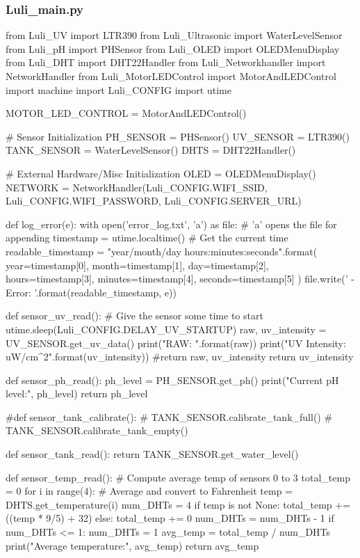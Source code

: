 \documentclass[12pt]{article} %
\begin{document}
\subsubsection{Luli\_main.py}
\begin{pythoncode}[caption={Main MicroPython Code}]
    
from Luli_UV import LTR390
from Luli_Ultrasonic import WaterLevelSensor
from Luli_pH import PHSensor
from Luli_OLED import OLEDMenuDisplay
from Luli_DHT import DHT22Handler
from Luli_Networkhandler import NetworkHandler
from Luli_MotorLEDControl import MotorAndLEDControl
import machine
import Luli_CONFIG
import utime

MOTOR_LED_CONTROL = MotorAndLEDControl()

# Sensor Initialization
PH_SENSOR = PHSensor()
UV_SENSOR = LTR390()
TANK_SENSOR = WaterLevelSensor()
DHTS = DHT22Handler()


# External Hardware/Misc Initialization
OLED = OLEDMenuDisplay()
NETWORK = NetworkHandler(Luli_CONFIG.WIFI_SSID, Luli_CONFIG.WIFI_PASSWORD, Luli_CONFIG.SERVER_URL)

def log_error(e):
    with open('error_log.txt', 'a') as file:  # 'a' opens the file for appending
        timestamp = utime.localtime()  # Get the current time
        readable_timestamp = "{year}/{month}/{day} {hours}:{minutes}:{seconds}".format(
            year=timestamp[0], month=timestamp[1], day=timestamp[2],
            hours=timestamp[3], minutes=timestamp[4], seconds=timestamp[5]
        )
        file.write('{} - Error: {}\n'.format(readable_timestamp, e))

def sensor_uv_read():
    # Give the sensor some time to start
    utime.sleep(Luli_CONFIG.DELAY_UV_STARTUP)
    raw, uv_intensity = UV_SENSOR.get_uv_data()
    print("RAW: {}".format(raw))
    print("UV Intensity: {}uW/cm^2".format(uv_intensity))
    #return raw, uv_intensity
    return uv_intensity

def sensor_ph_read():
    ph_level = PH_SENSOR.get_ph()
    print("Current pH level:", ph_level)
    return ph_level

#def sensor_tank_calibrate():
#    TANK_SENSOR.calibrate_tank_full()
#    TANK_SENSOR.calibrate_tank_empty()

def sensor_tank_read():
    return TANK_SENSOR.get_water_level()
    

def sensor_temp_read():
    # Compute average temp of sensors 0 to 3
    total_temp = 0
    for i in range(4):
        # Average and convert to Fahrenheit
        temp = DHTS.get_temperature(i)
        num_DHTs = 4
        if temp is not None:
            total_temp += ((temp * 9/5) + 32)
        else:
            total_temp += 0
            num_DHTs = num_DHTs - 1
    if num_DHTs <= 1:
        num_DHTs = 1
    avg_temp = total_temp / num_DHTs
    print("Average temperature:", avg_temp)
    return avg_temp


\end{pythoncode}
\end{document}
